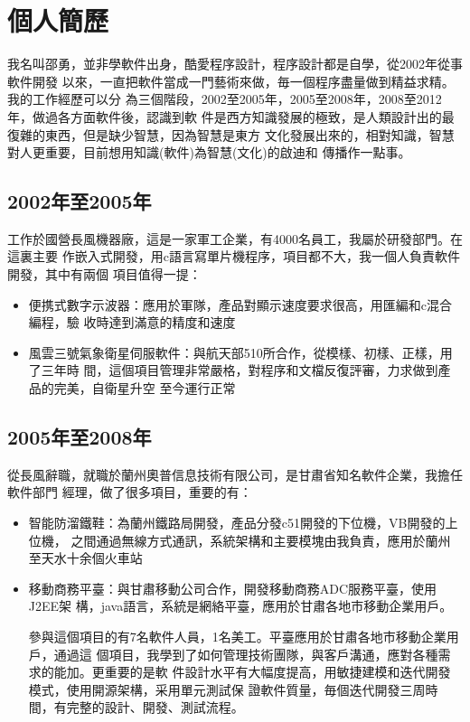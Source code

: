 

\section{個人簡歷}

我名叫邵勇，並非學軟件出身，酷愛程序設計，程序設計都是自學，從2002年從事軟件開發
以來，一直把軟件當成一門藝術來做，毎一個程序盡量做到精益求精。我的工作經歷可以分
為三個階段，2002至2005年，2005至2008年，2008至2012年，做過各方面軟件後，認識到軟
件是西方知識發展的極致，是人類設計出的最復雜的東西，但是缺少智慧，因為智慧是東方
文化發展出來的，相對知識，智慧對人更重要，目前想用知識(軟件)為智慧(文化)的啟迪和
傳播作一點事。

\subsection{2002年至2005年}

工作於國營長風機器廠，這是一家軍工企業，有4000名員工，我屬於研發部門。在這裏主要
作嵌入式開發，用c語言寫單片機程序，項目都不大，我一個人負責軟件開發，其中有兩個
項目值得一提：
\begin{itemize}
\item 便携式數字示波器：應用於軍隊，產品對顯示速度要求很高，用匯編和c混合編程，驗
  收時達到滿意的精度和速度
\item 風雲三號氣象衛星伺服軟件：與航天部510所合作，從模樣、初樣、正樣，用了三年時
  間，這個項目管理非常嚴格，對程序和文檔反復評審，力求做到產品的完美，自衛星升空
  至今運行正常
\end{itemize}

\subsection{2005年至2008年}

從長風辭職，就職於蘭州奧普信息技術有限公司，是甘肅省知名軟件企業，我擔任軟件部門
經理，做了很多項目，重要的有：
\begin{itemize}
\item 智能防溜鐵鞋：為蘭州鐵路局開發，產品分發c51開發的下位機，VB開發的上位機，
  之間通過無線方式通訊，系統架構和主要模塊由我負責，應用於蘭州至天水十余個火車站
\item 移動商務平臺：與甘肅移動公司合作，開發移動商務ADC服務平臺，使用J2EE架
  構，java語言，系統是網絡平臺，應用於甘肅各地市移動企業用戶。

  參與這個項目的有7名軟件人員，1名美工。平臺應用於甘肅各地市移動企業用戶，通過這
  個項目，我學到了如何管理技術團隊，與客戶溝通，應對各種需求的能加。更重要的是軟
  件設計水平有大幅度提高，用敏捷建模和迭代開發模式，使用開源架構，采用單元測試保
  證軟件質量，毎個迭代開發三周時間，有完整的設計、開發、測試流程。
\end{itemize}

